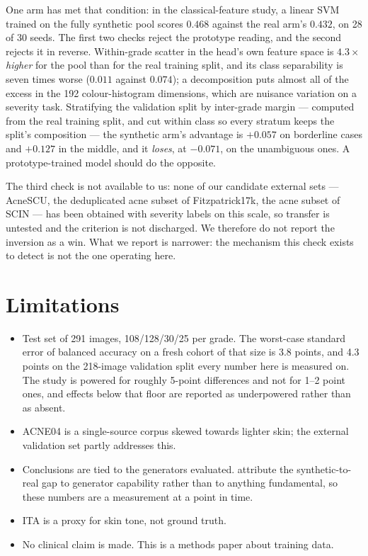 \documentclass[11pt]{article}
\begin{document}
One arm has met that condition: in the classical-feature study, a linear SVM trained on
the fully synthetic pool scores $0.468$ against the real arm's $0.432$, on 28 of 30 seeds.
The first two checks reject the prototype reading, and the second rejects it in reverse.
Within-grade scatter in the head's own feature space is $4.3\times$ \emph{higher} for the
pool than for the real training split, and its class separability is seven times worse
($0.011$ against $0.074$); a decomposition puts almost all of the excess in the 192
colour-histogram dimensions, which are nuisance variation on a severity task. Stratifying
the validation split by inter-grade margin --- computed from the real training split, and
cut within class so every stratum keeps the split's composition --- the synthetic arm's
advantage is $+0.057$ on borderline cases and $+0.127$ in the middle, and it \emph{loses},
at $-0.071$, on the unambiguous ones. A prototype-trained model should do the opposite.

The third check is not available to us: none of our candidate external sets --- AcneSCU,
the deduplicated acne subset of Fitzpatrick17k, the acne subset of SCIN --- has been
obtained with severity labels on this scale, so transfer is untested and the criterion is
not discharged. We therefore do not report the inversion as
a win. What we report is narrower: the mechanism this check exists to detect is not the
one operating here.

\section{Limitations}
\label{sec:limitations}
\begin{itemize}
  \item Test set of 291 images, 108/128/30/25 per grade. The worst-case standard
        error of balanced accuracy on a fresh cohort of that size is 3.8 points, and
        4.3 points on the 218-image validation split every number here is measured on.
        The study is powered for roughly 5-point differences and not for 1--2 point
        ones, and effects below that floor are reported as underpowered rather than
        as absent.
  \item ACNE04 is a single-source corpus skewed towards lighter skin; the external
        validation set partly addresses this.
  \item Conclusions are tied to the generators evaluated. \citet{fan2024} attribute
        the synthetic-to-real gap to generator capability rather than to anything
        fundamental, so these numbers are a measurement at a point in time.
  \item ITA is a proxy for skin tone, not ground truth.
  \item No clinical claim is made. This is a methods paper about training data.
\end{itemize}
\end{document}
